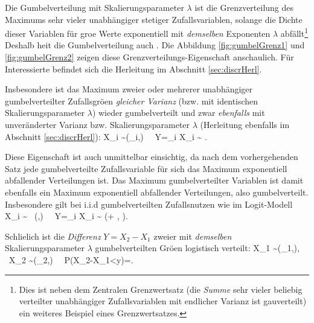 \item Die Gumbelverteilung mit Skalierungsparameter $\lambda$ ist die Grenzverteilung des
Maximums sehr vieler unabh\"angiger stetiger Zufallsvariablen, solange
die Dichte dieser Variablen f\"ur gro\3e Werte exponentiell mit
\emph{demselben} Exponenten $\lambda$ abf\"allt\footnote{Dies
  ist neben dem Zentralen 
Grenzwertsatz (die \textit{Summe} sehr vieler beliebig verteilter
unabh\"angiger Zufallsvariablen mit endlicher Varianz ist
gau\3verteilt) ein weiteres Beispiel eines Grenzwertsatzes.} 
Deshalb hei\3t die Gumbelverteilung auch
. 
Die Abbildung \ref{fig:gumbelGrenz1} und \ref{fig:gumbelGrenz2} zeigen
diese Grenz\-verteilungs-Eigenschaft anschaulich. F\"ur
Interessierte befindet sich die Herleitung im Abschnitt
\ref{sec:discrHerl}.

Insbesondere ist das Maximum zweier oder mehrerer unabh\"angiger 
gumbelverteilter
Zufallsgr\"o\3en \textit{gleicher Varianz} (bzw. mit identischen Skalierungsparameter
$\lambda$) wieder gumbelverteilt und zwar \emph{ebenfalls} mit unver\"anderter
Varianz bzw. 
Ska\-lierungs\-parameter $\lambda$ (Herleitung ebenfalls im Abschnitt
\ref{sec:discrHerl}): 
\be
\label{Gumbelii}
X_i \sim {}(\eta_i,\lambda)
\ \Rightarrow \ 
Y=\max_i X_i \sim  {} 
\left[\frac{1}{\lambda}\ln\left(\sum_{i=1}^Ie^{\lambda\eta_i}\right),\lambda \right].
\ee

Diese Eigenschaft ist auch unmittelbar einsichtig, da nach dem
vorhergehenden Satz jede
gumbelverteilte Zufallsvariable f\"ur sich das Maximum exponentiell
abfallender Verteilungen ist. Das Maximum gumbelverteilter
Variablen ist damit ebenfalls ein Maximum exponentiell
abfallender Verteilungen, also
gumbelverteilt. Insbesondere gilt bei i.i.d gumbelverteilten
Zufallsnutzen wie im Logit-Modell
\be
\label{GumbeliiHomo}
X_i \sim {} \ (\eta,\lambda)
\ \Rightarrow \ 
Y=\max_i X_i \sim  \text{Gu} 
\left(\eta+ , \lambda \right).
\ee

\item Schlie\3lich ist die \textit{Differenz} $Y=X_2-X_1$ zweier mit
\emph{demselben} Skalierungsparameter $\lambda$ gumbelverteilten
Gr\"o\3en logistisch verteilt:
\be
\label{Gumbeliii}
X_1 \sim {}(\eta_1,\lambda), \ X_2 \sim {}(\eta_2,\lambda)
\ \Rightarrow \ 
P(X_2-X_1<y)=.
\ee
\ei


